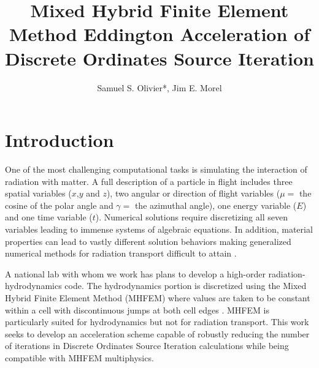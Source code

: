 \documentclass{anstrans}
\title{Mixed Hybrid Finite Element Method Eddington Acceleration of Discrete Ordinates Source Iteration}
\author{Samuel S. Olivier*, Jim E. Morel}
\institute{Department of Nuclear Engineering, Texas A\&M University, College Station, TX 77843}
\begin{document}
\section{Introduction}
	One of the most challenging computational tasks is simulating the interaction of radiation with matter. 
	A full description of a particle in flight includes three spatial variables ($x$,$y$ and $z$), two angular or direction of flight variables ($\mu =$ the cosine of the polar angle and $\gamma =$ the azimuthal angle), one energy variable ($E$) and one time variable ($t$). Numerical solutions require discretizing all seven variables leading to immense systems of algebraic equations. In addition, material properties can lead to vastly different solution behaviors making generalized numerical methods for radiation transport difficult to attain \cite{adams}. 



	A national lab with whom we work has plans to develop a high-order radiation-hydrodynamics code. The hydrodynamics portion is discretized using the Mixed Hybrid Finite Element Method (MHFEM) where values are taken to be constant within a cell with discontinuous jumps at both cell edges \cite{mhfem}. MHFEM is particularly suited for hydrodynamics but not for radiation transport. This work seeks to develop an acceleration scheme capable of robustly reducing the number of iterations in Discrete Ordinates Source Iteration calculations while being compatible with MHFEM multiphysics.   
\end{document}
